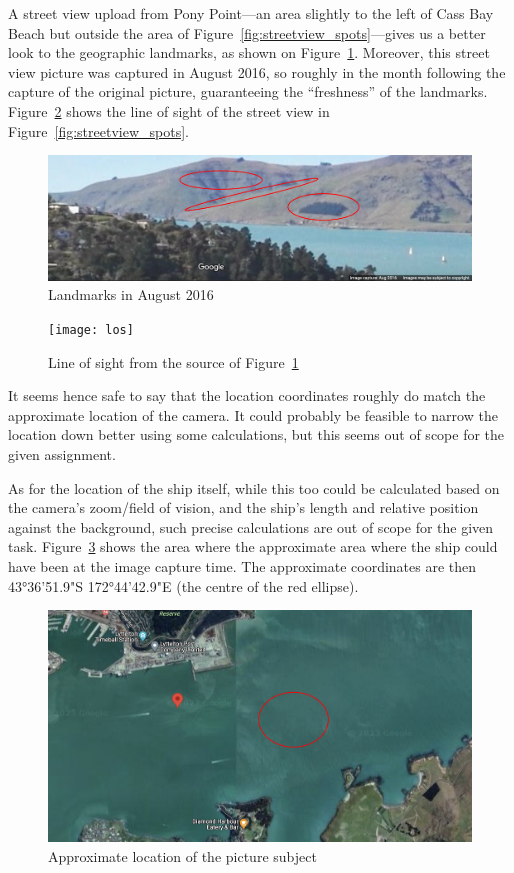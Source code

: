 \documentclass[parskip=half]{scrartcl}
\newcommand\figref{Figure~\ref}
\begin{document}
A street view upload from Pony Point---an area slightly to the left of Cass Bay
Beach but outside the area of \figref{fig:streetview_spots}---gives us a better
look to the geographic landmarks, as shown on \figref{fig:streetview_anno2}.
Moreover, this street view picture was captured in August 2016, so roughly in
the month following the capture of the original picture, guaranteeing the
``freshness'' of the landmarks. \figref{fig:los} shows the line of sight of the
street view in \figref{fig:streetview_spots}.

\begin{figure}[ht]
    \includegraphics[width=\textwidth]{sv_ss2_annotated}
    \centering
    \caption{Landmarks in August 2016}
    \label{fig:streetview_anno2}
\end{figure}

\begin{figure}[ht]
    \texttt{[image: los]}
    \centering
    \caption{Line of sight from the source of \figref{fig:streetview_anno2}}
    \label{fig:los}
\end{figure}

It seems hence safe to say that the location coordinates roughly do match the
approximate location of the camera. It could probably be feasible to narrow the
location down better using some calculations, but this seems out of scope for
the given assignment.

As for the location of the ship itself, while this too could be calculated
based on the camera's zoom/field of vision, and the ship's length and relative
position against the background, such precise calculations are out of scope for
the given task. \figref{fig:shiploc} shows the area where the approximate area
where the ship could have been at the image capture time. The approximate
coordinates are then 43°36'51.9"S 172°44'42.9"E (the centre of the red
ellipse).

\begin{figure}[ht]
    \includegraphics[width=\textwidth]{shiploc}
    \centering
    \caption{Approximate location of the picture subject}
    \label{fig:shiploc}
\end{figure}
\end{document}
